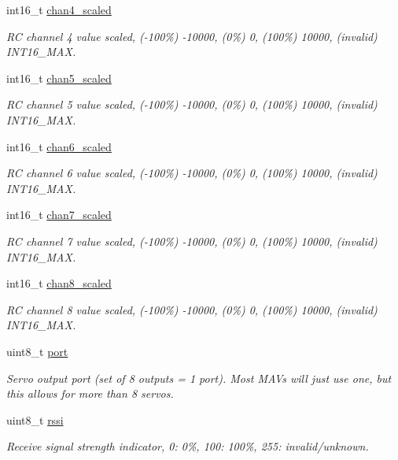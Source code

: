 \begin{DoxyCompactItemize}
int16\+\_\+t \hyperlink{struct____mavlink__rc__channels__scaled__t_a707b8ff01d82e1ddb4aa440c60265315}{chan4\+\_\+scaled}
\begin{DoxyCompactList}\small\item\em R\+C channel 4 value scaled, (-\/100\%) -\/10000, (0\%) 0, (100\%) 10000, (invalid) I\+N\+T16\+\_\+\+M\+A\+X. \end{DoxyCompactList}\item 
int16\+\_\+t \hyperlink{struct____mavlink__rc__channels__scaled__t_a746191bf8db147d0271f755814e62c5d}{chan5\+\_\+scaled}
\begin{DoxyCompactList}\small\item\em R\+C channel 5 value scaled, (-\/100\%) -\/10000, (0\%) 0, (100\%) 10000, (invalid) I\+N\+T16\+\_\+\+M\+A\+X. \end{DoxyCompactList}\item 
int16\+\_\+t \hyperlink{struct____mavlink__rc__channels__scaled__t_a0554cbaeb193f0243986c02c6396b159}{chan6\+\_\+scaled}
\begin{DoxyCompactList}\small\item\em R\+C channel 6 value scaled, (-\/100\%) -\/10000, (0\%) 0, (100\%) 10000, (invalid) I\+N\+T16\+\_\+\+M\+A\+X. \end{DoxyCompactList}\item 
int16\+\_\+t \hyperlink{struct____mavlink__rc__channels__scaled__t_a1e3c67b2bff9476d2c2da3e757993a1b}{chan7\+\_\+scaled}
\begin{DoxyCompactList}\small\item\em R\+C channel 7 value scaled, (-\/100\%) -\/10000, (0\%) 0, (100\%) 10000, (invalid) I\+N\+T16\+\_\+\+M\+A\+X. \end{DoxyCompactList}\item 
int16\+\_\+t \hyperlink{struct____mavlink__rc__channels__scaled__t_a53c6f6016f7f9e8a93ed1b1b959e1de7}{chan8\+\_\+scaled}
\begin{DoxyCompactList}\small\item\em R\+C channel 8 value scaled, (-\/100\%) -\/10000, (0\%) 0, (100\%) 10000, (invalid) I\+N\+T16\+\_\+\+M\+A\+X. \end{DoxyCompactList}\item 
uint8\+\_\+t \hyperlink{struct____mavlink__rc__channels__scaled__t_a8781afa3337e7a7e4b88b66569dcdf5a}{port}
\begin{DoxyCompactList}\small\item\em Servo output port (set of 8 outputs = 1 port). Most M\+A\+Vs will just use one, but this allows for more than 8 servos. \end{DoxyCompactList}\item 
uint8\+\_\+t \hyperlink{struct____mavlink__rc__channels__scaled__t_a06ada0758b5f85258d48fd19ebe7a5bd}{rssi}
\begin{DoxyCompactList}\small\item\em Receive signal strength indicator, 0\+: 0\%, 100\+: 100\%, 255\+: invalid/unknown. \end{DoxyCompactList}\end{DoxyCompactItemize}


